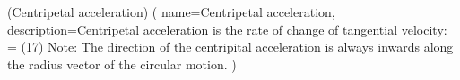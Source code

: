 \newglossaryentry(Centripetal acceleration)
(
     name=Centripetal acceleration,
     description={Centripetal acceleration is the rate of change of tangential velocity: = (17) Note: The direction of the centripital acceleration is always inwards along the radius vector of the circular motion.
}
     )
